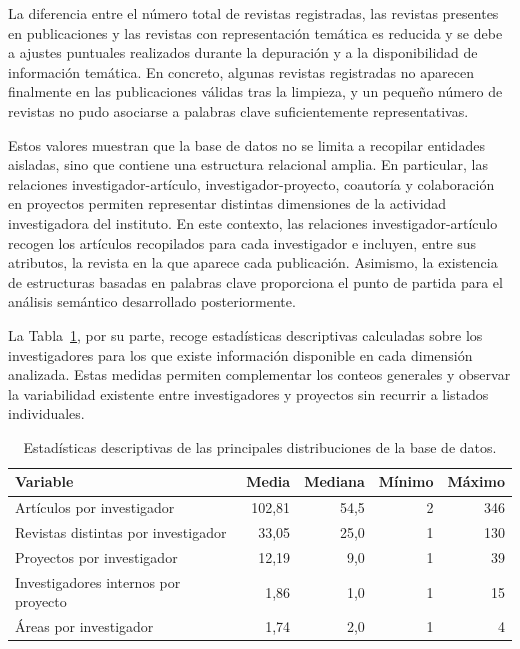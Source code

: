 \documentclass[11pt,spanish,listoffigures,listoftables]{tfgetsinf}
\begin{document}
La diferencia entre el número total de revistas registradas, las revistas presentes en publicaciones y las revistas con representación temática es reducida y se debe a ajustes puntuales realizados durante la depuración y a la disponibilidad de información temática. En concreto, algunas revistas registradas no aparecen finalmente en las publicaciones válidas tras la limpieza, y un pequeño número de revistas no pudo asociarse a palabras clave suficientemente representativas.

Estos valores muestran que la base de datos no se limita a recopilar entidades aisladas, sino que contiene una estructura relacional amplia. En particular, las relaciones investigador-artículo, investigador-proyecto, coautoría y colaboración en proyectos permiten representar distintas dimensiones de la actividad investigadora del instituto. En este contexto, las relaciones investigador-artículo recogen los artículos recopilados para cada investigador e incluyen, entre sus atributos, la revista en la que aparece cada publicación. Asimismo, la existencia de estructuras basadas en palabras clave proporciona el punto de partida para el análisis semántico desarrollado posteriormente.

La Tabla~\ref{tab:estadisticas_base_datos}, por su parte, recoge estadísticas descriptivas calculadas sobre los investigadores para los que existe información disponible en cada dimensión analizada. Estas medidas permiten complementar los conteos generales y observar la variabilidad existente entre investigadores y proyectos sin recurrir a listados individuales.

\begin{table}[H]
\centering
\small
\begin{tabular}{lrrrr}
\toprule
Variable & Media & Mediana & Mínimo & Máximo \\
\midrule
Artículos por investigador & 102,81 & 54,5 & 2 & 346 \\
Revistas distintas por investigador & 33,05 & 25,0 & 1 & 130 \\
Proyectos por investigador & 12,19 & 9,0 & 1 & 39 \\
Investigadores internos por proyecto & 1,86 & 1,0 & 1 & 15 \\
Áreas por investigador & 1,74 & 2,0 & 1 & 4 \\
\bottomrule
\end{tabular}
\caption{Estadísticas descriptivas de las principales distribuciones de la base de datos.}
\label{tab:estadisticas_base_datos}
\end{table}
\end{document}
